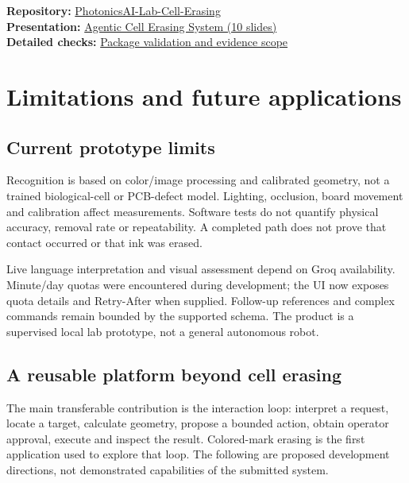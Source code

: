 \documentclass[10pt,a4paper]{article}
\newcommand{\repo}{https://github.com/Arenananyan/PhotonicsAI-Lab-Cell-Erasing}
\begin{document}
\textbf{Repository:} \href{\repo}{PhotonicsAI-Lab-Cell-Erasing}\\
\textbf{Presentation:} \href{\repo/blob/main/presentation/agentic_cell_erasing_simple.pdf}{Agentic Cell Erasing System (10 slides)}\\
\textbf{Detailed checks:} \href{\repo/blob/main/docs/VALIDATION.md}{Package validation and evidence scope}

\newpage
\section{Limitations and future applications}
\subsection{Current prototype limits}
Recognition is based on color/image processing and calibrated geometry, not a
trained biological-cell or PCB-defect model. Lighting, occlusion, board movement
and calibration affect measurements. Software tests do not quantify physical
accuracy, removal rate or repeatability. A completed path does not prove that
contact occurred or that ink was erased.

Live language interpretation and visual assessment depend on Groq availability.
Minute/day quotas were encountered during development; the UI now exposes quota
details and Retry-After when supplied. Follow-up references and complex commands
remain bounded by the supported schema. The product is a supervised local lab
prototype, not a general autonomous robot.

\subsection{A reusable platform beyond cell erasing}
The main transferable contribution is the interaction loop: interpret a request,
locate a target, calculate geometry, propose a bounded action, obtain operator
approval, execute and inspect the result. Colored-mark erasing is the first
application used to explore that loop. The following are proposed development
directions, not demonstrated capabilities of the submitted system.
\end{document}

